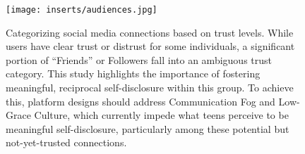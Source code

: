 \begin{figure}[t]
    \centering
    \texttt{[image: inserts/audiences.jpg]}
    \caption{Categorizing social media connections based on trust levels. While users have clear trust or distrust for some individuals, a significant portion of ``Friends'' or Followers fall into an ambiguous trust category. This study highlights the importance of fostering meaningful, reciprocal self-disclosure within this group. To achieve this, platform designs should address Communication Fog and Low-Grace Culture, which currently impede what teens perceive to be meaningful self-disclosure, particularly among these potential but not-yet-trusted connections.}
    \label{fig:audiences}
\end{figure}
